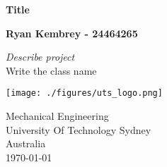 \begin{titlepage}
	\begin{center}
		\Huge
		\textbf{Title}

		\vspace{0.5cm}

		\LARGE

		\vspace{1cm}

		\textbf{Ryan Kembrey - 24464265}
		\begin{figure}[htbp!]
			\centering
			\label{fig:}
		\end{figure}
        \Large

        \textit{Describe project}\\
        Write the class name

		\vspace{0.6cm}

		\texttt{[image: ./figures/uts\_logo.png]}

		\large
		Mechanical Engineering\\
		University Of Technology Sydney\\
		Australia\\
		\vfill
		\today
		\vfill
	\end{center}
\end{titlepage}

